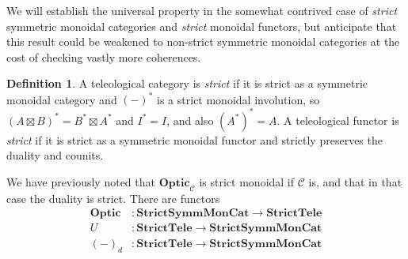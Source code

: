 \documentclass[11pt,letterpaper]{article}
\theoremstyle{plain}
\newtheorem{proposition}[theorem]{Proposition}
\theoremstyle{definition}
\newtheorem{definition}[theorem]{Definition}
\newcommand{\C}{\mathscr{C}}
\newcommand{\StrictSymmMonCat}{\mathbf{StrictSymmMonCat}}
\newcommand{\StrictTele}{\mathbf{StrictTele}}
\newcommand{\Optic}{\mathbf{Optic}}
\newcommand{\teletimes}{\mathbin{\boxtimes}}
\newcommand{\hto}{\ensuremath{\,\mathaccent\shortmid\rightarrow\,}}
\begin{document}

We will establish the universal property in the somewhat contrived case of \emph{strict} symmetric monoidal categories and \emph{strict} monoidal functors, but anticipate that this result could be weakened to non-strict symmetric monoidal categories at the cost of checking vastly more coherences.

\begin{definition}
A teleological category is \emph{strict} if it is strict as a symmetric monoidal category and ${(-)}^*$ is a strict monoidal involution, so ${(A \teletimes B)}^* = B^* \teletimes A^*$ and $I^* = I$, and also ${(A^*)}^* = A$. A teleological functor is \emph{strict} if it is strict as a symmetric monoidal functor and strictly preserves the duality and counits.
\end{definition}

We have previously noted that $\Optic_\C$ is strict monoidal if $\C$ is, and that in that case the duality is strict. There are functors
\begin{align*}
\Optic &: \StrictSymmMonCat \to \StrictTele \\
U &: \StrictTele \to \StrictSymmMonCat \\
{(-)}_d &: \StrictTele \to \StrictSymmMonCat 
\end{align*}
\end{document}
